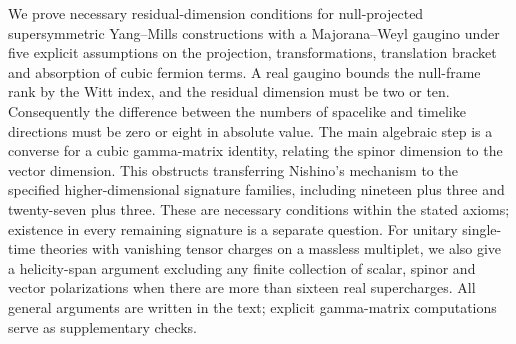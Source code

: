 We prove necessary residual-dimension conditions for null-projected supersymmetric Yang--Mills constructions with a Majorana--Weyl gaugino under five explicit assumptions on the projection, transformations, translation bracket and absorption of cubic fermion terms. A real gaugino bounds the null-frame rank by the Witt index, and the residual dimension must be two or ten. Consequently the difference between the numbers of spacelike and timelike directions must be zero or eight in absolute value. The main algebraic step is a converse for a cubic gamma-matrix identity, relating the spinor dimension to the vector dimension. This obstructs transferring Nishino's mechanism to the specified higher-dimensional signature families, including nineteen plus three and twenty-seven plus three. These are necessary conditions within the stated axioms; existence in every remaining signature is a separate question. For unitary single-time theories with vanishing tensor charges on a massless multiplet, we also give a helicity-span argument excluding any finite collection of scalar, spinor and vector polarizations when there are more than sixteen real supercharges. All general arguments are written in the text; explicit gamma-matrix computations serve as supplementary checks.
